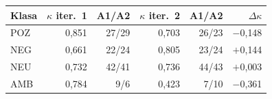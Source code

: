 \begin{tabular}{lrrrrr}
\toprule
Klasa & $\kappa$ iter.~1 & A1/A2 & $\kappa$ iter.~2 & A1/A2 & $\Delta\kappa$ \\
\midrule
POZ & 0{,}851 & 27/29 & 0{,}703 & 26/23 & $-$0{,}148 \\
NEG & 0{,}661 & 22/24 & 0{,}805 & 23/24 & $+$0{,}144 \\
NEU & 0{,}732 & 42/41 & 0{,}736 & 44/43 & $+$0{,}003 \\
AMB & 0{,}784 & 9/6 & 0{,}423 & 7/10 & $-$0{,}361 \\
\bottomrule
\end{tabular}
